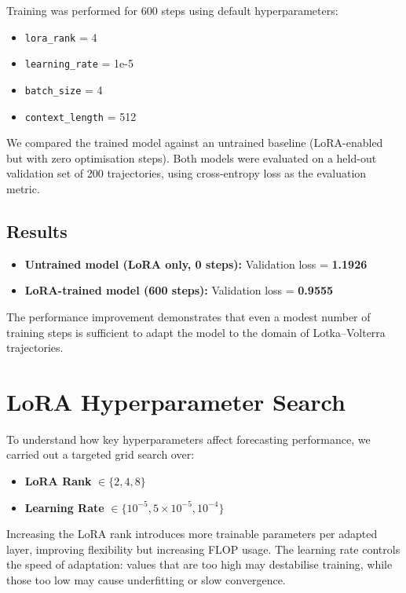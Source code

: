\documentclass[a4paper,12pt]{article}
\begin{document}
Training was performed for 600 steps using default hyperparameters:
\begin{itemize}
    \item \texttt{lora\_rank} = 4
    \item \texttt{learning\_rate} = 1e-5
    \item \texttt{batch\_size} = 4
    \item \texttt{context\_length} = 512
\end{itemize}

We compared the trained model against an untrained baseline (LoRA-enabled but with zero optimisation steps). Both models were evaluated on a held-out validation set of 200 trajectories, using cross-entropy loss as the evaluation metric.

\subsection*{Results}

\begin{itemize}
    \item \textbf{Untrained model (LoRA only, 0 steps):} Validation loss = \textbf{1.1926}
    \item \textbf{LoRA-trained model (600 steps):} Validation loss = \textbf{0.9555}
\end{itemize}

The performance improvement demonstrates that even a modest number of training steps is sufficient to adapt the model to the domain of Lotka–Volterra trajectories.

\section{LoRA Hyperparameter Search}

To understand how key hyperparameters affect forecasting performance, we carried out a targeted grid search over:
\begin{itemize}
    \item \textbf{LoRA Rank} $\in \{2, 4, 8\}$
    \item \textbf{Learning Rate} $\in \{10^{-5}, 5 \times 10^{-5}, 10^{-4}\}$
\end{itemize}

Increasing the LoRA rank introduces more trainable parameters per adapted layer, improving flexibility but increasing FLOP usage. The learning rate controls the speed of adaptation: values that are too high may destabilise training, while those too low may cause underfitting or slow convergence.
\end{document}
